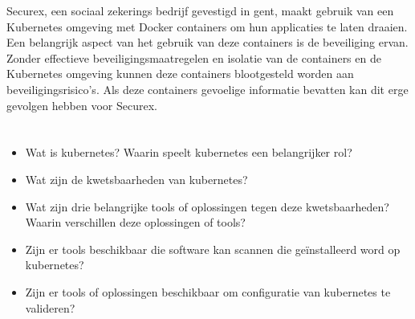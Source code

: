 Securex, een sociaal zekerings bedrijf gevestigd in gent, maakt gebruik van een Kubernetes omgeving met Docker containers om hun applicaties te laten draaien. Een belangrijk aspect van het gebruik van deze containers is de beveiliging ervan. Zonder effectieve beveiligingsmaatregelen en isolatie van de containers en de Kubernetes omgeving kunnen deze containers blootgesteld worden aan beveiligingsrisico's. Als deze containers gevoelige informatie bevatten kan dit erge gevolgen hebben voor Securex.


\section{}%
\label{sec:onderzoeksvraag}

\begin{itemize}
    \item Wat is kubernetes? Waarin speelt kubernetes een belangrijker rol?
    \item Wat zijn de kwetsbaarheden van kubernetes?
    \item Wat zijn drie belangrijke tools of oplossingen tegen deze kwetsbaarheden? Waarin verschillen deze oplossingen of tools?
    \item Zijn er tools beschikbaar die software kan scannen die geïnstalleerd word op kubernetes?
    \item Zijn er tools of oplossingen beschikbaar om configuratie van kubernetes te valideren?
\end{itemize}

